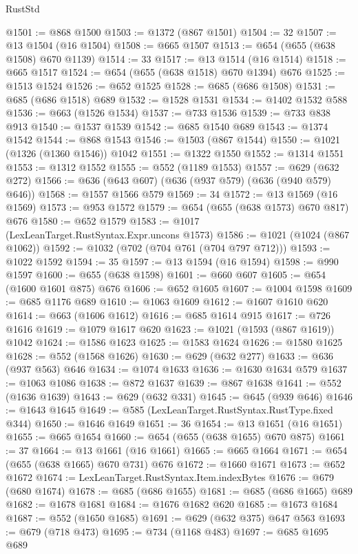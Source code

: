\begin{lexlean}{RustStd}
\begin{coremodule}
@1501 := @868 @1500
@1503 := @1372 (@867 @1501)
@1504 := 32
@1507 := @13 @1504 (@16 @1504)
@1508 := @665 @1507
@1513 := @654 (@655 (@638 @1508) @670 @1139)
@1514 := 33
@1517 := @13 @1514 (@16 @1514)
@1518 := @665 @1517
@1524 := @654 (@655 (@638 @1518) @670 @1394) @676
@1525 := @1513 @1524
@1526 := @652 @1525
@1528 := @685 (@686 @1508)
@1531 := @685 (@686 @1518) @689
@1532 := @1528 @1531
@1534 := @1402 @1532 @588
@1536 := @663 (@1526 @1534)
@1537 := @733 @1536
@1539 := @733 @838 @913
@1540 := @1537 @1539
@1542 := @685 @1540 @689
@1543 := @1374 @1542
@1544 := @868 @1543
@1546 := @1503 (@867 @1544)
@1550 := @1021 (@1326 (@1360 @1546)) @1042
@1551 := @1322 @1550
@1552 := @1314 @1551
@1553 := @1312 @1552
@1555 := @552 (@1189 @1553)
@1557 := @629 (@632 @272)
@1566 := @636 (@643 @607) (@636 (@937 @579) (@636 (@940 @579) @646))
@1568 := @1557 @1566 @579
@1569 := 34
@1572 := @13 @1569 (@16 @1569)
@1573 := @953 @1572
@1579 := @654 (@655 (@638 @1573) @670 @817) @676
@1580 := @652 @1579
@1583 := @1017 (LexLeanTarget.RustSyntax.Expr.uncons @1573)
@1586 := @1021 (@1024 (@867 @1062))
@1592 := @1032 (@702 (@704 @761 (@704 @797 @712)))
@1593 := @1022 @1592
@1594 := 35
@1597 := @13 @1594 (@16 @1594)
@1598 := @990 @1597
@1600 := @655 (@638 @1598)
@1601 := @660 @607
@1605 := @654 (@1600 @1601 @875) @676
@1606 := @652 @1605
@1607 := @1004 @1598
@1609 := @685 @1176 @689
@1610 := @1063 @1609
@1612 := @1607 @1610 @620
@1614 := @663 (@1606 @1612)
@1616 := @685 @1614 @915
@1617 := @726 @1616
@1619 := @1079 @1617 @620
@1623 := @1021 (@1593 (@867 @1619)) @1042
@1624 := @1586 @1623
@1625 := @1583 @1624
@1626 := @1580 @1625
@1628 := @552 (@1568 @1626)
@1630 := @629 (@632 @277)
@1633 := @636 (@937 @563) @646
@1634 := @1074 @1633
@1636 := @1630 @1634 @579
@1637 := @1063 @1086
@1638 := @872 @1637
@1639 := @867 @1638
@1641 := @552 (@1636 @1639)
@1643 := @629 (@632 @331)
@1645 := @645 (@939 @646)
@1646 := @1643 @1645
@1649 := @585 (LexLeanTarget.RustSyntax.RustType.fixed @344)
@1650 := @1646 @1649
@1651 := 36
@1654 := @13 @1651 (@16 @1651)
@1655 := @665 @1654
@1660 := @654 (@655 (@638 @1655) @670 @875)
@1661 := 37
@1664 := @13 @1661 (@16 @1661)
@1665 := @665 @1664
@1671 := @654 (@655 (@638 @1665) @670 @731) @676
@1672 := @1660 @1671
@1673 := @652 @1672
@1674 := LexLeanTarget.RustSyntax.Item.indexBytes
@1676 := @679 (@680 @1674)
@1678 := @685 (@686 @1655)
@1681 := @685 (@686 @1665) @689
@1682 := @1678 @1681
@1684 := @1676 @1682 @620
@1685 := @1673 @1684
@1687 := @552 (@1650 @1685)
@1691 := @629 (@632 @375) @647 @563
@1693 := @679 (@718 @473)
@1695 := @734 (@1168 @483)
@1697 := @685 @1695 @689

\end{coremodule}
\end{lexlean}
